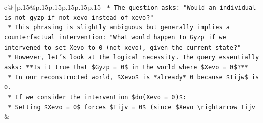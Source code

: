 \documentclass{article}
\begin{document}
{\begin{supertabular}{c@{$\;$}|p{.15\linewidth}@{}p{.15\linewidth}p{.15\linewidth}p{.15\linewidth}p{.15\linewidth}p{.15\linewidth}}
{{{\texttt{    *   The question asks: "Would an individual is not gyzp if not xevo instead of xevo?"} \\
\texttt{    *   This phrasing is slightly ambiguous but generally implies a counterfactual intervention: "What would happen to Gyzp if we intervened to set Xevo to 0 (not xevo), given the current state?"} \\
\texttt{    *   However, let's look at the logical necessity. The query essentially asks: **Is it true that \$Gyzp = 0\$ in the world where \$Xevo = 0\$?**} \\
\texttt{    *   In our reconstructed world, \$Xevo\$ is *already* 0 because \$Tijw\$ is 0.} \\
\texttt{    *   If we consider the intervention \$do(Xevo = 0)\$:} \\
\texttt{        *   Setting \$Xevo = 0\$ forces \$Tijv = 0\$ (since \$Xevo \textbackslash{}rightarrow Tijv} \\
            }
        }
    }
    & \\ \\


\end{supertabular}}
\end{document}
